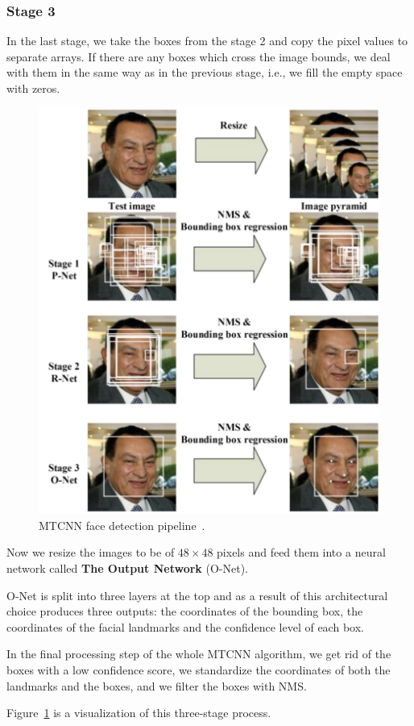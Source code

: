 \subsubsection{Stage 3}
In the last stage, we take the boxes from the stage 2 and copy the pixel values to separate arrays.
If there are any boxes which cross the image bounds, we deal with them in the same way as in the previous stage,
i.e., we fill the empty space with zeros.

\begin{figure}
\centering
\includegraphics[width=0.6\columnwidth]{images/face-recognition/mtcnn.png}
\caption{MTCNN face detection pipeline~\cite{MTCNN}.}
\label{fig:mtcnn}
\end{figure}
Now we resize the images to be of $48 \times 48$ pixels and feed them into a neural network called
\textbf{The Output Network} (O-Net).

O-Net is split into three layers at the top and as a result of this architectural choice produces three outputs:
the coordinates of the bounding box, the coordinates of the facial landmarks and the confidence level of each box.

In the final processing step of the whole MTCNN algorithm, we get rid of the boxes with a low confidence score,
we standardize the coordinates of both the landmarks and the boxes, and  we filter the boxes with NMS.


Figure~\ref{fig:mtcnn} is a visualization of this three-stage process.